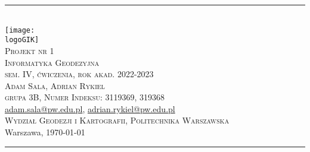 \documentclass[10pt,a4paper]{article}
\makeatletter
\newcommand{\logoGIK}{settings/WGiK-znak.png}
\newcommand{\authorName}{Adam Sala, Adrian Rykiel  \\ grupa 3B, Numer Indeksu: 3119369, 319368}
\newcommand{\titeReport}{Projekt nr 1} %
\newcommand{\titleLecture}{Informatyka Geodezyjna \\ sem. IV, ćwiczenia, rok akad. 2022-2023} %
\newcommand{\mymail}{\href{mailto:adam.sala@pw.edu.pl}{adam.sala@pw.edu.pl}}
\newcommand{\mymaillll}{\href{mailto:aadrian.rykiel@pw.edu.pl}{adrian.rykiel@pw.edu.pl}}
\newcommand{\faculty}{Wydział Geodezji i Kartografii}
\newcommand{\university}{Politechnika Warszawska}
\newcommand{\city}{Warszawa}
\makeatother
\begin{document}
\begin{center} 
\rule{\textwidth}{.5pt} \\
\vspace{1.0cm}
    \texttt{[image: \\logoGIK]}
\vspace{0.5cm} \\
	\Large \textsc{\titeReport}
\vspace{0.5cm} \\  
	\large \textsc{\titleLecture}
\vspace{0.5cm}\\
	\textsc{\authorName}  \\
	\mymail, \mymaillll \\
	\textsc{\faculty}, \textsc{\university}  \\ 
	 \city, \today
\end{center} 
\rule{\textwidth}{1.5pt}

\tableofcontents 								%
\newpage





\citet{ASGEUPOS2021,Kadaj2001,Kadaj}
\end{document}
